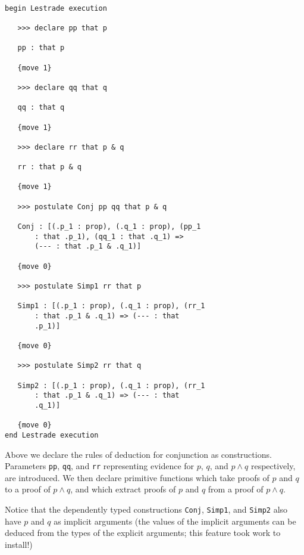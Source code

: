 \documentclass[12pt]{article}
\begin{document}
\begin{verbatim}

begin Lestrade execution

   >>> declare pp that p

   pp : that p

   {move 1}

   >>> declare qq that q

   qq : that q

   {move 1}

   >>> declare rr that p & q

   rr : that p & q

   {move 1}

   >>> postulate Conj pp qq that p & q

   Conj : [(.p_1 : prop), (.q_1 : prop), (pp_1 
       : that .p_1), (qq_1 : that .q_1) => 
       (--- : that .p_1 & .q_1)]

   {move 0}

   >>> postulate Simp1 rr that p

   Simp1 : [(.p_1 : prop), (.q_1 : prop), (rr_1 
       : that .p_1 & .q_1) => (--- : that 
       .p_1)]

   {move 0}

   >>> postulate Simp2 rr that q

   Simp2 : [(.p_1 : prop), (.q_1 : prop), (rr_1 
       : that .p_1 & .q_1) => (--- : that 
       .q_1)]

   {move 0}
end Lestrade execution
\end{verbatim}

Above we declare the rules of deduction for conjunction as constructions.   Parameters {\tt pp}, {\tt qq}, and {\tt rr} representing evidence for $p$, $q$, and $p \wedge q$ respectively, are introduced.  We then declare primitive functions which take proofs of $p$ and $q$ to a proof of $p \wedge q$, and which extract proofs of $p$ and $q$ from a proof of $p \wedge q$.

Notice that the dependently typed constructions {\tt Conj}, {\tt Simp1}, and {\tt Simp2} also have $p$ and $q$ as implicit arguments (the values of the implicit arguments can be deduced from the types of the explicit arguments;  this feature took work to install!)
\end{document}
